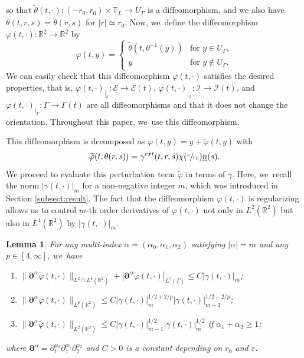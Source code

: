 \documentclass[11pt]{article}
\newenvironment{enumeratei}
{\bgroup\def\theenumi{\roman{enumi}}\def\theenumii{\arabic{enumii}}\begin{enumerate}}
{\end{enumerate}\egroup}
\newcommand{\R}{{\mathbb R}}
\newcommand{\dt}{\partial_t}
\newcommand{\cI}{{\mathcal I}}
\newcommand{\cE}{{\mathcal E}}
\newcommand{\ul}[1]{\underline{#1}}
\newcommand{\itGamma}{\mathit{\Gamma}}
\newtheorem{lemma}[theorem]{Lemma}
\theoremstyle{definition}
\begin{document}
so that $\tilde{\theta}(t,\cdot): (-r_0,r_0)\times\mathbb{T}_L \to U_{\ul{\itGamma}}$ is a diffeomorphism,
and we also have $\tilde{\theta}(t,r,s)=\theta(r,s)$ for $|r|\simeq r_0$.
Now, we~define the diffeomorphism $\varphi(t,\cdot) : \R^2 \to \R^2$ by
\begin{equation}\label{const phi}
\varphi(t,y) =
\begin{cases}
\tilde{\theta}(t,\theta^{-1}(y)) &\text{for } y \in U_{\ul{\itGamma}}, \\
y & \text{for } y \notin U_{\ul{\itGamma}}.
\end{cases}
\end{equation}
We can easily check that this diffeomorphism $\varphi(t,\cdot)$ satisfies the desired properties, that is,
$\varphi(t,\cdot)_{\vert_{\ul{\cE}}} : \ul{\cE}\to \cE(t)$, $\varphi(t,\cdot)_{\vert_{\ul{\cI}}} : \ul{\cI}\to \cI(t)$, and
$\varphi(t,\cdot)_{\vert_{\ul{\itGamma}}} : \ul{\itGamma}\to \itGamma(t)$ are all diffeomorphisms and that it does not change the orientation.
Throughout this paper, we~use this diffeomorphism.

This diffeomorphism is decomposed as $\varphi(t,y)=y+\widetilde{\varphi}(t,y)$ with
\[
\widetilde{\varphi}(t,\theta(r,s))=\gamma^{\rm ext}(t,r,s)\chi(\sfrac{r}{r_0})\ul{n}(s).
\]
We proceed to evaluate this perturbation term $\widetilde{\varphi}$ in terms of $\gamma$.
Here, we~recall the norm $|\gamma(t,\cdot)|_m$ for a non-negative integer $m$, which was introduced in Section \ref{subsect:result}.
The fact that the diffeomorphism $\varphi(t,\cdot)$ is regularizing allows us to control $m$-th order derivatives of $\varphi(t,\cdot)$
not only in $L^2(\R^2)$ but also in $L^4(\R^2)$ by $|\gamma(t,\cdot)|_m$.

\begin{lemma}\label{lem:EstDM}
For any multi-index $\alpha=(\alpha_0,\alpha_1,\alpha_2)$ satisfying $|\alpha|=m$ and any $p\in[4,\infty]$, we~have
\begin{enumeratei}
\item\label{lem:EstDMi}
$\|\bm{\partial}^\alpha\widetilde{\varphi}(t,\cdot)\|_{L^2\cap L^4(\R^2)} + |\bm{\partial}^\alpha\widetilde{\varphi}(t,\cdot)|_{L^2(\ul{\itGamma})}
\leq C|\gamma(t,\cdot)|_m$;
\item\label{lem:EstDMii}
$\|\bm{\partial}^\alpha\widetilde{\varphi}(t,\cdot)\|_{L^p(\R^2)}\leq C|\gamma(t,\cdot)|_m^{1/2+2/p}|\gamma(t,\cdot)|_{m+1}^{1/2-2/p}$;
\item\label{lem:EstDMiii}
$\|\bm{\partial}^\alpha\widetilde{\varphi}(t,\cdot)\|_{L^2(\R^2)}\leq C|\gamma(t,\cdot)|_{m-1}^{1/2}|\gamma(t,\cdot)|_m^{1/2}$ if $\alpha_1+\alpha_2\geq1$;
\end{enumeratei}
where $\bm{\partial}^\alpha=\dt^{\alpha_0}\partial_1^{\alpha_1}\partial_2^{\alpha_2}$ and $C>0$ is a constant depending on $r_0$ and $\varepsilon$.
\end{lemma}
\end{document}
